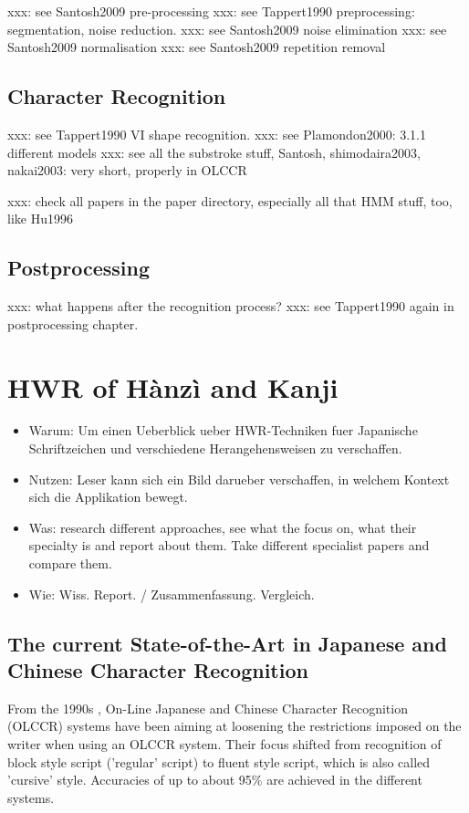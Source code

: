 xxx: see Santosh2009 pre-processing
xxx: see Tappert1990 preprocessing: segmentation, noise reduction.
xxx: see Santosh2009 noise elimination
xxx: see Santosh2009 normalisation
xxx: see Santosh2009 repetition removal

\subsection{Character Recognition}
\label{sec:characterrecognition}

xxx: see Tappert1990 VI shape recognition.
xxx: see Plamondon2000: 3.1.1 different models
xxx: see all the substroke stuff, Santosh, shimodaira2003, nakai2003: very short, properly in OLCCR

xxx: check all papers in the paper directory, especially all that HMM stuff,
too, like Hu1996

\subsection{Postprocessing}
\label{sec:postprocessing}

xxx: what happens after the recognition process?
xxx: see Tappert1990 again in postprocessing chapter.

\section{HWR of Hànzì and Kanji}
\begin{itemize}
\item Warum: Um einen Ueberblick ueber HWR-Techniken fuer Japanische 
  Schriftzeichen und verschiedene Herangehensweisen zu verschaffen.
\item Nutzen: Leser kann sich ein Bild darueber verschaffen,
  in welchem Kontext sich die Applikation bewegt.
\item Was: research different approaches, see what the focus on, 
  what their specialty is and report about them. Take different specialist 
  papers and compare them.
\item Wie: Wiss. Report. / Zusammenfassung. Vergleich. 
\end{itemize}

\subsection{The current State-of-the-Art in Japanese and Chinese Character Recognition}
From the 1990s  , On-Line Japanese and Chinese Character Recognition 
(OLCCR) systems have been aiming at loosening the restrictions imposed on 
the writer when using an OLCCR system. Their focus shifted from recognition 
of block style script ('regular' script) to fluent style script, 
which is also called 'cursive' style. Accuracies of up to about 95\% are
achieved in the different systems.

